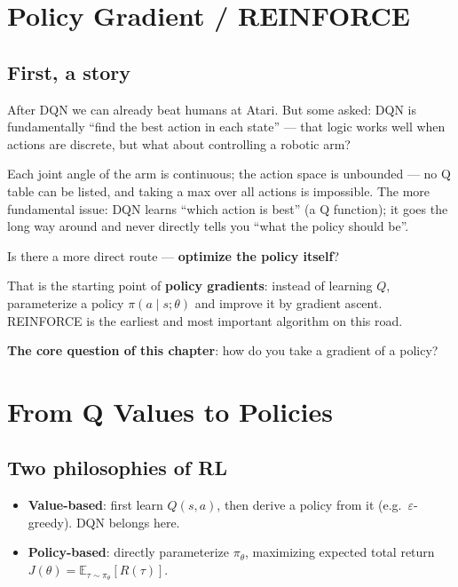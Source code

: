 \documentclass{article}
\begin{document}
\section*{Policy Gradient / REINFORCE}

\subsection*{First, a story}

After DQN we can already beat humans at Atari. But some asked: DQN is fundamentally ``find the best action in each state'' --- that logic works well when actions are discrete, but what about controlling a robotic arm?

Each joint angle of the arm is continuous; the action space is unbounded --- no Q table can be listed, and taking a max over all actions is impossible. The more fundamental issue: DQN learns ``which action is best'' (a Q function); it goes the long way around and never directly tells you ``what the policy should be''.

Is there a more direct route --- \textbf{optimize the policy itself}?

That is the starting point of \textbf{policy gradients}: instead of learning $Q$, parameterize a policy $\pi(a \mid s; \theta)$ and improve it by gradient ascent. REINFORCE is the earliest and most important algorithm on this road.

\textbf{The core question of this chapter}: how do you take a gradient of a policy?

\section*{From Q Values to Policies}

\subsection*{Two philosophies of RL}

\begin{itemize}
  \item \textbf{Value-based}: first learn $Q(s,a)$, then derive a policy from it (e.g.\ $\varepsilon$-greedy). DQN belongs here.
  \item \textbf{Policy-based}: directly parameterize $\pi_\theta$, maximizing expected total return $J(\theta) = \mathbb{E}_{\tau \sim \pi_\theta}[R(\tau)]$.
\end{itemize}
\end{document}
